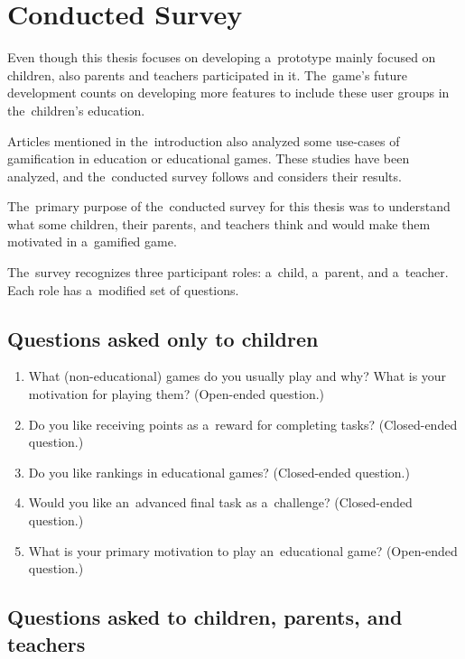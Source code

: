 \section{Conducted Survey}

Even though this thesis focuses on developing a~prototype mainly focused on children, also parents and teachers participated in it.
The~game's future development counts on developing more features to include these user groups in the~children's education.

Articles mentioned in the~introduction also analyzed some use-cases of gamification in education or educational games.
These studies have been analyzed, and the~conducted survey follows and considers their results. 

The~primary purpose of the~conducted survey for this thesis was to understand what some children, their parents, and teachers think and would make them motivated in a~gamified game.

The~survey recognizes three participant roles: a~child, a~parent, and a~teacher.
Each role has a~modified set of questions.

\subsection*{Questions asked only to children}

\begin{enumerate}
    \item What (non-educational) games do you usually play and why? What is your motivation for playing them? (Open-ended question.)
    \item Do you like receiving points as a~reward for completing tasks? (Closed-ended question.)
    \item Do you like rankings in educational games? (Closed-ended question.)
    \item Would you like an~advanced final task as a~challenge? (Closed-ended question.)
    \item What is your primary motivation to play an~educational game? (Open-ended question.)
\end{enumerate}

\subsection*{Questions asked to children, parents, and teachers}


